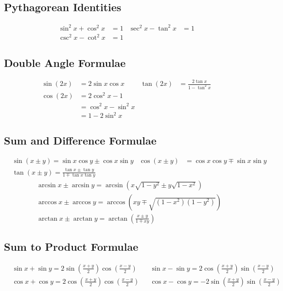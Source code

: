 \documentclass[12pt]{article}
\begin{document}
\subsection{Pythagorean Identities}

\begin{align*}
	\sin^2x + \cos^2x &= 1 &  \sec^2 x - \tan^2x &= 1 \\
	 \csc^2 x - \cot^2 x &= 1
\end{align*}

\subsection{Double Angle Formulae}
\begin{align*}
\sin{(2x)} &= 2\sin x\cos x & \tan{(2x)} &= \frac{2\tan x}{1 - \tan^2x} \\
\cos{(2x)} &= 2\cos^2x - 1 \\
&= \cos^2x - \sin^2x \\ &= 1 - 2\sin^2x
\end{align*}




\subsection{Sum and Difference Formulae}
\begin{align*}
&\sin{(x \pm y)} = \sin x\cos y \pm \cos x\sin y &
\cos{(x \pm y)} &= \cos x \cos y \mp \sin x \sin y \\
&\tan{(x \pm y)} = \frac{\tan x \pm \tan y}{1 \mp \tan x \tan y}
\end{align*}
\begin{align*}
&\arcsin x \pm \arcsin y = \arcsin{(x\sqrt{1 - y^2}\pm y\sqrt{1 - x^2})} \\ &\arccos x \pm \arccos y = \arccos{(xy \mp \sqrt{(1-x^2)(1-y^2)})} \\
&\arctan x \pm \arctan y = \arctan{(\frac{x\pm y}{1 \mp xy})}
\end{align*}

\subsection{Sum to Product Formulae}
\begin{align*}
&\sin x + \sin y = 2\sin{\left(\frac{x+y}{2}\right)}\cos{\left(\frac{x-y}{2}\right)} & &\sin x - \sin y = 2\cos{\left(\frac{x+y}{2}\right)}\sin{\left(\frac{x-y}{2}\right)} \\
&\cos x + \cos y = 2\cos{\left(\frac{x+y}{2}\right)}\cos{\left(\frac{x-y}{2}\right)} & 
&\cos x - \cos y = -2\sin{\left(\frac{x+y}{2}\right)}\sin{\left(\frac{x-y}{2}\right)}
\end{align*}
\end{document}
